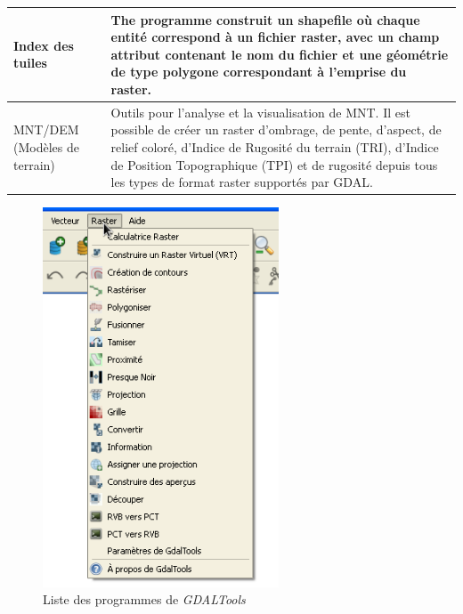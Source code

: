 {\begin{longtable}{|p{3cm}|p{13cm}|}
\hline Index des tuiles &  The programme construit un shapefile où chaque entité correspond à un fichier raster, avec un champ attribut contenant le nom du fichier et une géométrie de type polygone correspondant à l'emprise du raster.\\
\hline MNT/DEM (Modèles de terrain) &  Outils pour l'analyse et la visualisation de MNT. Il est possible de créer un raster d'ombrage, de pente, d'aspect, de relief coloré, d'Indice de Rugosité du terrain (TRI), d'Indice de Position Topographique (TPI) et de rugosité depuis tous les types de format raster supportés par GDAL.\\
\hline
\end{longtable}

\begin{figure}[ht]
   \centering
   \caption{Liste des programmes de \emph{GDALTools} \nixcaption}\label{gdaltools_menu}
   \includegraphics[clip=true, width=7cm]{plugins_gdaltools_images/raster_menu}
\end{figure}

}
